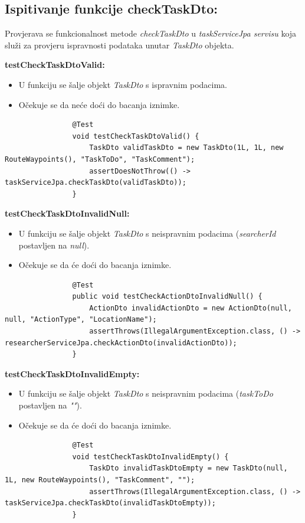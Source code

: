 			\subsection{Ispitivanje funkcije checkTaskDto:}
			Provjerava se funkcionalnost metode \textit{checkTaskDto} u \textit{taskServiceJpa servisu} koja služi za provjeru ispravnosti podataka unutar \textit{TaskDto} objekta.
			
			\textbf{testCheckTaskDtoValid:}
			\begin{itemize}
				\item U funkciju se šalje objekt \textit{TaskDto} s ispravnim podacima.
				\item Očekuje se da neće doći do bacanja iznimke.
			\end{itemize}
			\begin{lstlisting}
				@Test
				void testCheckTaskDtoValid() {
					TaskDto validTaskDto = new TaskDto(1L, 1L, new RouteWaypoints(), "TaskToDo", "TaskComment");
					assertDoesNotThrow(() -> taskServiceJpa.checkTaskDto(validTaskDto));
				}
			\end{lstlisting}
			
			\textbf{testCheckTaskDtoInvalidNull:}
			\begin{itemize}
				\item U funkciju se šalje objekt \textit{TaskDto} s neispravnim podacima (\textit{searcherId} postavljen na \textit{null}).
				\item Očekuje se da će doći do bacanja iznimke.
			\end{itemize}
			\begin{lstlisting}
				@Test
				public void testCheckActionDtoInvalidNull() {
					ActionDto invalidActionDto = new ActionDto(null, null, "ActionType", "LocationName");
					assertThrows(IllegalArgumentException.class, () -> researcherServiceJpa.checkActionDto(invalidActionDto));
				}
			\end{lstlisting}
			
			\textbf{testCheckTaskDtoInvalidEmpty:}
			\begin{itemize}
				\item U funkciju se šalje objekt \textit{TaskDto} s neispravnim podacima (\textit{taskToDo} postavljen na \textit{""}).
				\item Očekuje se da će doći do bacanja iznimke.
			\end{itemize}
			\begin{lstlisting}
				@Test
				void testCheckTaskDtoInvalidEmpty() {
					TaskDto invalidTaskDtoEmpty = new TaskDto(null, 1L, new RouteWaypoints(), "TaskComment", "");
					assertThrows(IllegalArgumentException.class, () -> taskServiceJpa.checkTaskDto(invalidTaskDtoEmpty));
				}
			\end{lstlisting}
			
